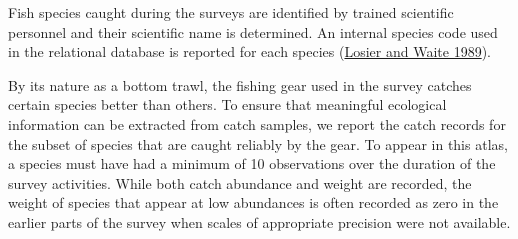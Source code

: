 \documentclass[12pt]{article}\usepackage[]{graphicx}\usepackage[]{color}
\begin{document}
Fish species caught during the surveys are identified by trained scientific personnel and their scientific name is determined. An internal species code used in the relational database is reported for each species (\protect\hyperlink{ref-LosierWaite1989}{Losier and Waite 1989}).

By its nature as a bottom trawl, the fishing gear used in the survey catches certain species better than others. To ensure that meaningful ecological information can be extracted from catch samples, we report the catch records for the subset of species that are caught reliably by the gear. To appear in this atlas, a species must have had a minimum of 10 observations over the duration of the survey activities. While both catch abundance and weight are recorded, the weight of species that appear at low abundances is often recorded as zero in the earlier parts of the survey when scales of appropriate precision were not available.
\end{document}
